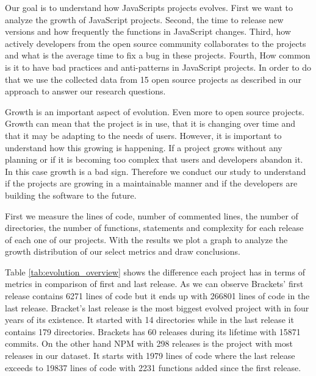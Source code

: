 Our goal is to understand how JavaScripts projects evolves. First we want to analyze the growth of JavaScript projects. Second, the time to release new versions and how frequently the functions in JavaScript changes. Third, how actively developers from the open source community collaborates to the projects and what is the average time to fix a bug in these projects. Fourth, How common is it to have bad practices and anti-patterns in JavaScript projects. In order to do that we use the collected data from 15 open source projects as described in our approach to answer our research questions. 

\vspace{3 mm}
\noindent{\rqi}
\vspace{3 mm}

 Growth is an important aspect of evolution. Even more to open source projects. Growth can mean that the project is in use, that it is changing over time and that it may be adapting to the needs of users. However, it is important to understand how this growing is happening. If a project grows without any planning or if it is becoming too complex that users and developers abandon it. In this case growth is a bad sign. Therefore we conduct our study to understand if the projects are growing in a maintainable manner and if the developers are building the software to the future.   

\vspace{1 mm}
 First we measure the lines of code, number of commented lines, the number of directories, the number of functions, statements and complexity for each release of each one of our projects. With the results we plot a graph to analyze the growth distribution of our select metrics and draw conclusions. 

\vspace{1 mm}
 Table \ref{tab:evolution_overview} shows the difference each project has in terms of metrics in comparison of first and last release.
As we can observe Brackets' first release contains 6271 lines of code but it ends up with 266801 lines of code in the last release. Bracket's last release is the most biggest evolved project with in four years of its existence. It started with 14 directories while in the last release it contains 179 directories. Brackets has 60 releases during its lifetime with 15871 commits. On the other hand NPM with 298 releases is the project with most releases in our dataset. It starts with 1979 lines of code where the last release exceeds to 19837 lines of code with 2231 functions added since the first release.

